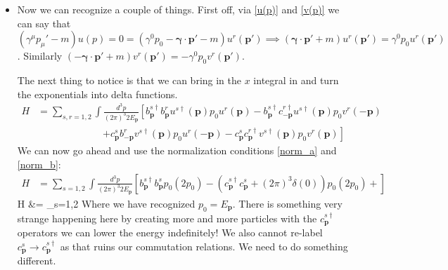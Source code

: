 \documentclass[11pt]{article}
\renewenvironment{flalign}{\vspace{-2mm}\empheq[box=\tcbhighmath]{align}}{\endempheq}
\numberwithin{equation}{section}
\begin{document}
     \begin{itemize}
       \item  Now we can recognize a couple of things. First off, via \ref{u(p)} and \ref{v(p)} we can say that $(\gamma^{\mu}p_{\mu}'-m)u(p)= 0 = (\gamma^{0}p_{0}-\boldsymbol{\gamma}\cdot \textbf{p}' -m)u^{r}(\textbf{p}') \implies  (\boldsymbol{\gamma}\cdot \textbf{p}' +m)u^{r}(\textbf{p}') = \gamma^{0}p_0u^{r}(\textbf{p}')$. Similarly $(-\boldsymbol{\gamma}\cdot \textbf{p}' +m)v^{r}(\textbf{p}') = -\gamma^{0}p_0v^{r}(\textbf{p}')$. 

       The next thing to notice is that we can bring in the $x$ integral in and turn the exponentials into delta functions. 
       \begin{align*}
         H &= \sum_{s,r=1,2}\int \frac{d^3p}{(2\pi)^3 2E_{\textbf{p}}}\left[b^{s \dagger}_{\textbf{p}}b^{r}_{\textbf{p}}u^{s\dagger}(\textbf{p})p_0u^{r}(\textbf{p})-b^{s\dagger}_{\textbf{p}}c^{r\dagger}_{-\textbf{p}}u^{s\dagger}(\textbf{p})p_0v^{r}(-\textbf{p})\right. \\
      &~~~~~~~~~~~~~~~~~~~~~~~~~~~~~~\left.+c^{s}_{\textbf{p}}b^{r}_{-\textbf{p}}v^{s\dagger}(\textbf{p})p_0u^{r}(-\textbf{p})-c^{s}_{\textbf{p}}c^{r\dagger}_{\textbf{p}}v^{s\dagger}(\textbf{p})p_0v^{r}(\textbf{p})\right]
       \end{align*}
       We can now go ahead and use the normalization conditions \ref{norm_a} and \ref{norm_b}: 
       \begin{align*}
          H &= \sum_{s=1,2}\int \frac{d^3p}{(2\pi)^3 2E_{\textbf{p}}}\left[b^{s \dagger}_{\textbf{p}}b^{s}_{\textbf{p}}p_0(2p_0)-(c^{s\dagger}_{\textbf{p}}c^{s}_{\textbf{p}}+(2\pi)^3\delta(0))p_0(2p_0)+\right]
        \end{align*}
        \begin{flalign}
        \label{Ham_D}
           \implies H  &= \sum_{s=1,2}\int {}
         \end{flalign} 
         Where we have recognized $p_0 = E_{\textbf{p}}$. There is something very strange happening here by creating more and more particles with the $c^{s\dagger}_{\textbf{p}}$ operators we can lower the energy indefinitely! We also cannot re-label $c^{s}_{\textbf{p}}\rightarrow c^{s\dagger}_{\textbf{p}}$ as that ruins our commutation relations. We need to do something different.  
     \end{itemize}
\end{document}
